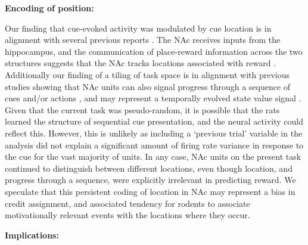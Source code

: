 \documentclass[11pt]{article}
\let\cite=\citep
\begin{document}
{\bf Encoding of position:}

Our finding that cue-evoked activity was modulated by cue location is
in alignment with several previous reports
\cite{Lavoie1994,Wiener2003,Mulder2005,Strait2016}. The NAc receives
inputs from the hippocampus, and the communication of place-reward
information across the two structures suggests that the NAc tracks
locations associated with reward
\cite{Tabuchi2000,Pennartz2004,Lansink2008,Lansink2009,VanderMeer2011,Lansink2016,Sjulson2017}. Additionally our finding of a tiling of task space is in alignment with previous studies showing that NAc units can also signal progress through a sequence of cues and/or
actions \cite{Shidara1998,Mulder2004,Khamassi2008,Berke2009,Lansink2012,Atallah2014}, and may represent a temporally evolved state value signal \cite{Pennartz2011,Hamid2016}. Given
that the current task was pseudo-random, it is possible that the rats
learned the structure of sequential cue presentation, and the neural
activity could reflect this. However, this is unlikely as including a
‘previous trial’ variable in the analysis did not explain a
significant amount of firing rate variance in response to the cue for
the vast majority of units. In any case, NAc units on the present
task continued to distinguish between different locations, even though
location, and progress through a sequence, were explicitly irrelevant
in predicting reward. We speculate that this persistent coding of
location in NAc may represent a bias in credit assignment, and
associated tendency for rodents to associate motivationally relevant
events with the locations where they occur.

{\bf Implications:}
\end{document}
